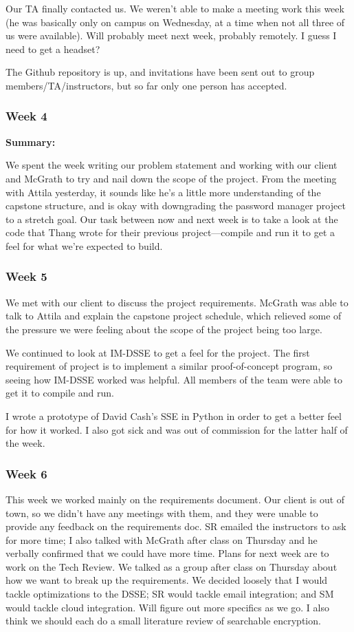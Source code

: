 Our TA finally contacted us. We weren't able to make a meeting work this week (he was basically only on campus on Wednesday, at a time when not all three of us were available). Will probably meet next week, probably remotely. I guess I need to get a headset?

The Github repository is up, and invitations have been sent out to group members/TA/instructors, but so far only one person has accepted.

\subsubsection{Week 4}

\noindent \textbf{Summary:}

We spent the week writing our problem statement and working with our client and McGrath to try and nail down the scope of the project. From the meeting with Attila yesterday, it sounds like he's a little more understanding of the capstone structure, and is okay with downgrading the password manager project to a stretch goal. Our task between now and next week is to take a look at the code that Thang wrote for their previous project—compile and run it to get a feel for what we're expected to build.

\subsubsection{Week 5}

We met with our client to discuss the project requirements. McGrath was able to talk to Attila and explain the capstone project schedule, which relieved some of the pressure we were feeling about the scope of the project being too large.

We continued to look at IM-DSSE to get a feel for the project. The first requirement of project is to implement a similar proof-of-concept program, so seeing how IM-DSSE worked was helpful. All members of the team were able to get it to compile and run.

I wrote a prototype of David Cash's SSE in Python in order to get a better feel for how it worked. I also got sick and was out of commission for the latter half of the week.

\subsubsection{Week 6}

This week we worked mainly on the requirements document. Our client is out of town, so we didn't have any meetings with them, and they were unable to provide any feedback on the requirements doc. SR emailed the instructors to ask for more time; I also talked with McGrath after class on Thursday and he verbally confirmed that we could have more time. Plans for next week are to work on the Tech Review. We talked as a group after class on Thursday about how we want to break up the requirements. We decided loosely that I would tackle optimizations to the DSSE; SR would tackle email integration; and SM would tackle cloud integration. Will figure out more specifics as we go. I also think we should each do a small literature review of searchable encryption.

